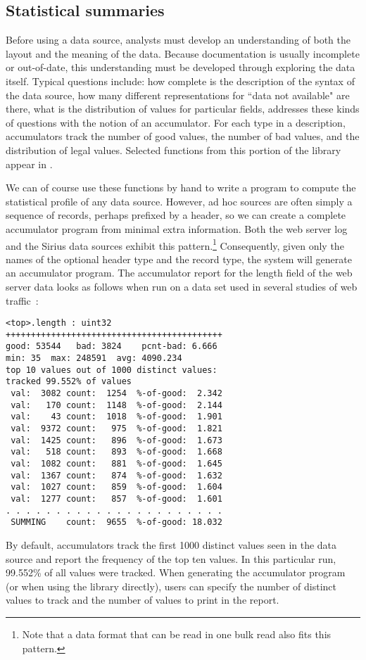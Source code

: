 \documentclass{sig-alternate}
\newcommand{\dibbler}{Sirius}
\begin{document}
\subsection{Statistical summaries}
Before using a data source, analysts must develop an understanding 
of both the layout and the meaning of the data.  
Because documentation is usually
incomplete or out-of-date, this understanding must be developed 
through exploring the data itself.  Typical questions include:
how complete is the description of the syntax of the data source,
how many different representations for ``data not available" are there,
what is the distribution of values for particular fields, \etc{}
\pads{} addresses these kinds of questions with the notion of an accumulator. 
For each type in a \pads{} description, accumulators track the number of good values, the number of bad values, and the 
distribution of legal values.  Selected functions from this portion of the library appear in .  

We can of course use these functions by hand to write
a program to compute the statistical profile of any \pads{} data source.
However, ad hoc sources are often simply a sequence of records, perhaps prefixed by a header, so we can create a complete accumulator program from minimal extra information.  Both the web server log and the \dibbler{} data sources exhibit this pattern.\footnote{
  Note that a data format that can be read in one bulk read also fits this pattern.
} 
Consequently, given only the names of the optional
header type and the record type, the \pads{} system will generate 
an accumulator program.  The accumulator report for the length field
of the web server data looks as follows when run on a data set used
in several studies of web traffic~\cite{clf-cluster, clf-adaptation}:

\begin{small}
\begin{verbatim}
<top>.length : uint32
+++++++++++++++++++++++++++++++++++++++++++
good: 53544   bad: 3824    pcnt-bad: 6.666
min: 35  max: 248591  avg: 4090.234
top 10 values out of 1000 distinct values:
tracked 99.552% of values
 val:  3082 count:  1254  %-of-good:  2.342
 val:   170 count:  1148  %-of-good:  2.144
 val:    43 count:  1018  %-of-good:  1.901
 val:  9372 count:   975  %-of-good:  1.821
 val:  1425 count:   896  %-of-good:  1.673
 val:   518 count:   893  %-of-good:  1.668
 val:  1082 count:   881  %-of-good:  1.645
 val:  1367 count:   874  %-of-good:  1.632
 val:  1027 count:   859  %-of-good:  1.604
 val:  1277 count:   857  %-of-good:  1.601
. . . . . . . . . . . . . . . . . . . . . . 
 SUMMING    count:  9655  %-of-good: 18.032
\end{verbatim}
\end{small}
%
By default, accumulators track the first 1000 distinct
values seen in the data source and report the frequency
of the top ten values.  In this particular run, 99.552\%
of all values were tracked.  When generating the accumulator
program (or when using the library directly), \pads{} users can specify 
the number of distinct values to track and the number 
of values to print in the report.
\end{document}
